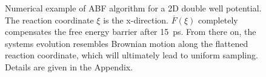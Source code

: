 \begin{figure}[H]
    \centering
    \caption{Numerical example of ABF algorithm for a 2D double well potential. The reaction coordinate $\xi$ is the x-direction. $\overline{F}(\xi)$ completely compensates the free energy barrier after 15~ps. From there on, the systems evolution resembles Brownian motion along the flattened reaction coordinate, which will ultimately lead to uniform sampling. Details are given in the Appendix.}
\label{fig:ABF}%
\end{figure}

